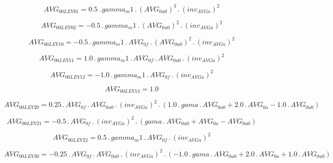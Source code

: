 \documentclass{article}
\begin{document}
\begin{dmath}AVG_{0 0 LEV 01} = 0.5 \,.\, gamma_m1 \,.\, \left(AVG_{0 u0} \right)^{3} \,.\, \left(inv_{AVG a} \right)^{2}\end{dmath}

\begin{dmath}AVG_{0 0 LEV 02} = - 0.5 \,.\, gamma_m1 \,.\, \left(AVG_{0 u0} \right)^{2} \,.\, \left(inv_{AVG a} \right)^{2}\end{dmath}

\begin{dmath}AVG_{0 0 LEV 10} = - 0.5 \,.\, gamma_m1 \,.\, AVG_{0 f} \,.\, \left(AVG_{0 u0} \right)^{2} \,.\, \left(inv_{AVG a} \right)^{2}\end{dmath}

\begin{dmath}AVG_{0 0 LEV 11} = 1.0 \,.\, gamma_m1 \,.\, AVG_{0 f} \,.\, AVG_{0 u0} \,.\, \left(inv_{AVG a} \right)^{2}\end{dmath}

\begin{dmath}AVG_{0 0 LEV 12} = - 1.0 \,.\, gamma_m1 \,.\, AVG_{0 f} \,.\, \left(inv_{AVG a} \right)^{2}\end{dmath}

\begin{dmath}AVG_{0 0 LEV 13} = 1.0\end{dmath}

\begin{dmath}AVG_{0 0 LEV 20} = 0.25 \,.\, AVG_{0 f} \,.\, AVG_{0 u0} \,.\, \left(inv_{AVG a} \right)^{2} \,.\, \left(1.0 \,.\, gama \,.\, AVG_{0 u0} + 2.0 \,.\, AVG_{0 a} - 1.0 \,.\, AVG_{0 u0}\right)\end{dmath}

\begin{dmath}AVG_{0 0 LEV 21} = - 0.5 \,.\, AVG_{0 f} \,.\, \left(inv_{AVG a} \right)^{2} \,.\, \left(gama \,.\, AVG_{0 u0} + AVG_{0 a} - AVG_{0 u0}\right)\end{dmath}

\begin{dmath}AVG_{0 0 LEV 22} = 0.5 \,.\, gamma_m1 \,.\, AVG_{0 f} \,.\, \left(inv_{AVG a} \right)^{2}\end{dmath}

\begin{dmath}AVG_{0 0 LEV 30} = - 0.25 \,.\, AVG_{0 f} \,.\, AVG_{0 u0} \,.\, \left(inv_{AVG a} \right)^{2} \,.\, \left(- 1.0 \,.\, gama \,.\, AVG_{0 u0} + 2.0 \,.\, AVG_{0 a} + 1.0 \,.\, AVG_{0 u0}\right)\end{dmath}
\end{document}
